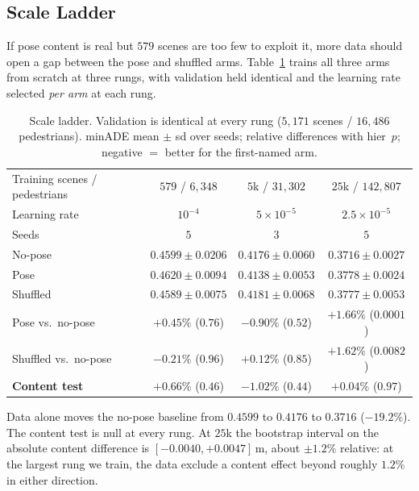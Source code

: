 \documentclass{article} %
\newcommand{\minADE}{minADE\xspace}
\begin{document}
\subsection{Scale Ladder}
\label{sec:res_ladder}

If pose content is real but $579$ scenes are too few to exploit it, more data
should open a gap between the pose and shuffled arms. Table~\ref{tab:ladder}
trains all three arms from scratch at three rungs, with validation held identical
and the learning rate selected \emph{per arm} at each rung.

\begin{table}[t]
\caption{Scale ladder. Validation is identical at every rung
($5{,}171$ scenes / $16{,}486$ pedestrians). \minADE mean $\pm$ sd over seeds;
relative differences with hier~$p$; negative $=$ better for the first-named arm.}
\label{tab:ladder}
\begin{center}
\footnotesize
\begin{tabular}{lccc}
\toprule
Training scenes / pedestrians & $579$ / $6{,}348$ & $5$k / $31{,}302$ & $25$k / $142{,}807$ \\
Learning rate & $10^{-4}$ & $5{\times}10^{-5}$ & $2.5{\times}10^{-5}$ \\
Seeds & $5$ & $3$ & $5$ \\
\midrule
No-pose  & $0.4599 \pm 0.0206$ & $0.4176 \pm 0.0060$ & $0.3716 \pm 0.0027$ \\
Pose     & $0.4620 \pm 0.0094$ & $0.4138 \pm 0.0053$ & $0.3778 \pm 0.0024$ \\
Shuffled & $0.4589 \pm 0.0075$ & $0.4181 \pm 0.0068$ & $0.3777 \pm 0.0053$ \\
\midrule
Pose vs.\ no-pose      & $+0.45\%$ ($0.76$) & $-0.90\%$ ($0.52$) & $+1.66\%$ ($0.0001$) \\
Shuffled vs.\ no-pose  & $-0.21\%$ ($0.96$) & $+0.12\%$ ($0.85$) & $+1.62\%$ ($0.0082$) \\
\textbf{Content test}  & $+0.66\%$ ($0.46$) & $-1.02\%$ ($0.44$) & $+0.04\%$ ($0.97$) \\
\bottomrule
\end{tabular}
\end{center}
\end{table}

Data alone moves the no-pose baseline from $0.4599$ to $0.4176$ to $0.3716$
($-19.2\%$). The content test is null at every rung. At $25$k the bootstrap
interval on the absolute content difference is $[-0.0040, +0.0047]$\,m, about
$\pm1.2\%$ relative: at the largest rung we train, the data exclude a content
effect beyond roughly $1.2\%$ in either direction.
\end{document}
